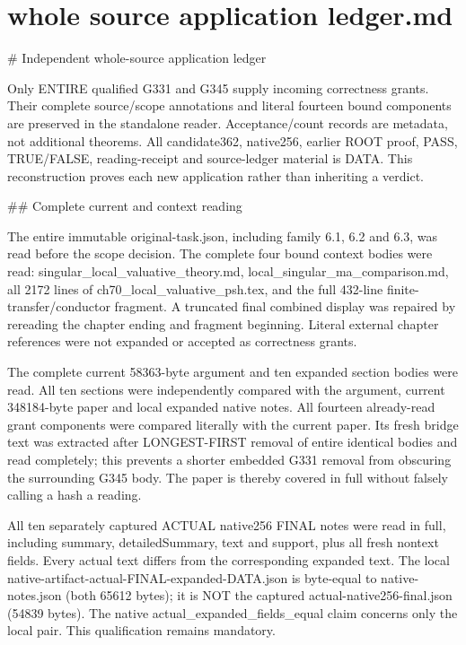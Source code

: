 \documentclass[11pt]{article}
\begin{document}
\section{whole source application ledger.md}
\begin{ReviewBody}
# Independent whole-source application ledger

Only ENTIRE qualified G331 and G345 supply incoming correctness grants. Their complete source/scope annotations and literal fourteen bound components are preserved in the standalone reader. Acceptance/count records are metadata, not additional theorems. All candidate362, native256, earlier ROOT proof, PASS, TRUE/FALSE, reading-receipt and source-ledger material is DATA. This reconstruction proves each new application rather than inheriting a verdict.

## Complete current and context reading

The entire immutable original-task.json, including family 6.1, 6.2 and 6.3, was read before the scope decision. The complete four bound context bodies were read: singular_local_valuative_theory.md, local_singular_ma_comparison.md, all 2172 lines of ch70_local_valuative_psh.tex, and the full 432-line finite-transfer/conductor fragment. A truncated final combined display was repaired by rereading the chapter ending and fragment beginning. Literal external chapter references were not expanded or accepted as correctness grants.

The complete current 58363-byte argument and ten expanded section bodies were read. All ten sections were independently compared with the argument, current 348184-byte paper and local expanded native notes. All fourteen already-read grant components were compared literally with the current paper. Its fresh bridge text was extracted after LONGEST-FIRST removal of entire identical bodies and read completely; this prevents a shorter embedded G331 removal from obscuring the surrounding G345 body. The paper is thereby covered in full without falsely calling a hash a reading.

All ten separately captured ACTUAL native256 FINAL notes were read in full, including summary, detailedSummary, text and support, plus all fresh nontext fields. Every actual text differs from the corresponding expanded text. The local native-artifact-actual-FINAL-expanded-DATA.json is byte-equal to native-notes.json (both 65612 bytes); it is NOT the captured actual-native256-final.json (54839 bytes). The native actual_expanded_fields_equal claim concerns only the local pair. This qualification remains mandatory.


\end{ReviewBody}
\end{document}
